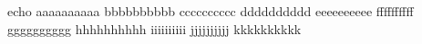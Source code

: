 \documentclass[11pt,a4paper,oneside]{book}
\begin{document}
\begin{code}[language=bash]
echo aaaaaaaaaa bbbbbbbbbb cccccccccc dddddddddd eeeeeeeeee ffffffffff gggggggggg hhhhhhhhhh iiiiiiiiii jjjjjjjjjj kkkkkkkkkk
\end{code}
\end{document}
